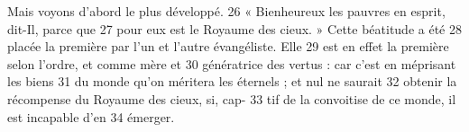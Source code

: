Mais voyons d'abord le plus développé.	 
26	 	« Bienheureux les pauvres en esprit, dit-Il, parce que	 
27	 	pour eux est le Royaume des cieux. » Cette béatitude a été	 
28	 	placée la première par l'un et l'autre évangéliste. Elle	 
29	 	est en effet la première selon l'ordre, et comme mère et	 
30	 	génératrice des vertus : car c'est en méprisant les biens	 
31	 	du monde qu'on méritera les éternels ; et nul ne saurait	 
32	 	obtenir la récompense du Royaume des cieux, si, cap-	 
33	 	tif de la convoitise de ce monde, il est incapable d'en	 
34	 	émerger.